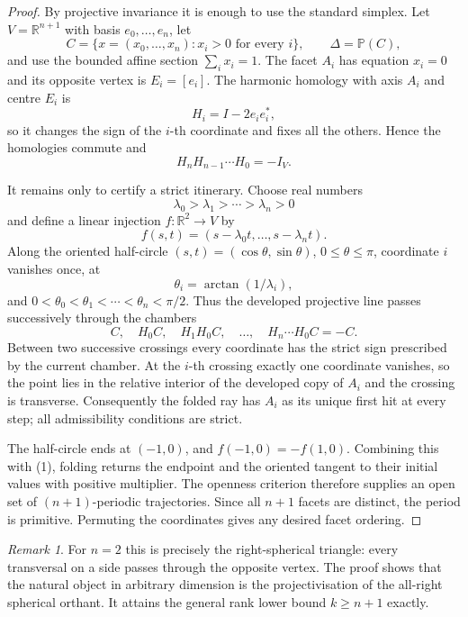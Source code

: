 \documentclass[11pt,a4paper]{article}
\theoremstyle{plain}
\theoremstyle{definition}
\theoremstyle{remark}
\newtheorem{remark}[theorem]{Remark}
\begin{document}
\begin{proof}
By projective invariance it is enough to use the standard simplex.  Let
$V=\mathbb R^{n+1}$ with basis $e_0,\ldots,e_n$, let
\[
 C=\{x=(x_0,\ldots,x_n):x_i>0\text{ for every }i\},
 \qquad \Delta=\mathbb P(C),
\]
and use the bounded affine section $\sum_i x_i=1$.  The facet $A_i$ has equation
$x_i=0$ and its opposite vertex is $E_i=[e_i]$.  The harmonic homology with axis
$A_i$ and centre $E_i$ is
\[
 H_i=I-2e_i e_i^*,
\]
so it changes the sign of the $i$-th coordinate and fixes all the others.  Hence
the homologies commute and
\[
             H_nH_{n-1}\cdots H_0=-I_V.                 \tag{1}
\]

It remains only to certify a strict itinerary.  Choose real numbers
\[
        \lambda_0>\lambda_1>\cdots>\lambda_n>0
\]
and define a linear injection $f:\mathbb R^2\to V$ by
\[
        f(s,t)=(s-\lambda_0t,\ldots,s-\lambda_nt).
\]
Along the oriented half-circle $(s,t)=(\cos\theta,\sin\theta)$,
$0\le\theta\le\pi$, coordinate $i$ vanishes once, at
\[
        \theta_i=\arctan(1/\lambda_i),
\]
and
$0<\theta_0<\theta_1<\cdots<\theta_n<\pi/2$.  Thus the developed projective
line passes successively through the chambers
\[
 C,\quad H_0C,\quad H_1H_0C,\quad\ldots,\quad
 H_n\cdots H_0C=-C.
\]
Between two successive crossings every coordinate has the strict sign prescribed
by the current chamber.  At the $i$-th crossing exactly one coordinate vanishes,
so the point lies in the relative interior of the developed copy of $A_i$ and the
crossing is transverse.  Consequently the folded ray has $A_i$ as its unique first
hit at every step; all admissibility conditions are strict.

The half-circle ends at $(-1,0)$, and $f(-1,0)=-f(1,0)$.  Combining this with
(1), folding returns the endpoint and the oriented tangent to their initial values
with positive multiplier.  The openness criterion therefore supplies an open set
of $(n+1)$-periodic trajectories.  Since all $n+1$ facets are distinct, the period
is primitive.  Permuting the coordinates gives any desired facet ordering.
\end{proof}

\begin{remark}
For $n=2$ this is precisely the right-spherical triangle: every transversal on a
side passes through the opposite vertex.  The proof shows that the natural object
in arbitrary dimension is the projectivisation of the all-right spherical orthant.
It attains the general rank lower bound $k\ge n+1$ exactly.
\end{remark}
\end{document}
